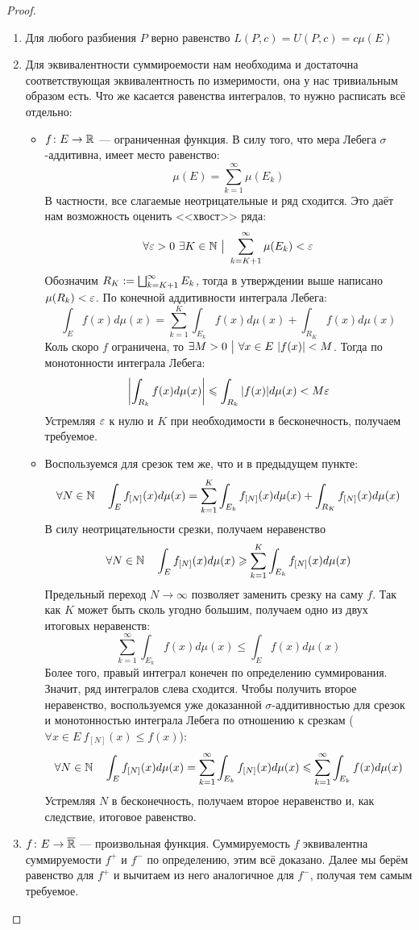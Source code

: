\begin{proof}~
	\begin{enumerate}
		\item Для любого разбиения $P$ верно равенство $L(P, c) = U(P, c) = c\mu(E)$
		
		\item Для эквивалентности суммироемости нам необходима и достаточна соответствующая эквивалентность по измеримости, она у нас тривиальным образом есть. Что же касается равенства интегралов, то нужно расписать всё отдельно:
		\begin{itemize}
			\item $f \colon E \to \mathbb{R}$ --- ограниченная функция. В силу того, что мера Лебега $\sigma$-аддитивна, имеет место равенство:
			\[
				\mu(E) = \sum_{k = 1}^\infty \mu(E_k)
			\]
			В частности, все слагаемые неотрицательные и ряд сходится. Это даёт нам возможность оценить <<хвост>> ряда:
			\[
				\forall \varepsilon > 0\ \exists K \in \mathbb{N} \ \big|\  \sum_{k = K + 1}^\infty \mu(E_k) < \varepsilon
			\]
			Обозначим $R_K := \bigsqcup_{k = K + 1}^\infty E_k$, тогда в утверждении выше написано $\mu(R_k) < \varepsilon$. По конечной аддитивности интеграла Лебега:
			\[
				\int_E f(x)d\mu(x) = \sum_{k = 1}^K \int_{E_k} f(x)d\mu(x) + \int_{R_K} f(x)d\mu(x)
			\]
			Коль скоро $f$ ограничена, то $\exists M > 0 \ \big|\   \forall x \in E\ |f(x)| < M$. Тогда по монотонности интеграла Лебега:
			\[
				\left|\int_{R_k} f(x)d\mu(x)\right| \leqslant \int_{R_k} |f(x)|d\mu(x) < M\varepsilon
			\]
			Устремляя $\varepsilon$ к нулю и $K$ при необходимости в бесконечность, получаем требуемое. 
			
			\item Воспользуемся для срезок тем же, что и в предыдущем пункте:
			\[
				\forall N \in \mathbb{N} \quad \int_E f_{[N]}(x)d\mu(x) = \sum_{k = 1}^K \int_{E_k} f_{[N]}(x)d\mu(x) + \int_{R_K} f_{[N]}(x)d\mu(x)
			\]
			В силу неотрицательности срезки, получаем неравенство
			\[
				\forall N \in \mathbb{N} \quad \int_E f_{[N]}(x)d\mu(x) \geqslant \sum_{k = 1}^K \int_{E_k} f_{[N]}(x)d\mu(x)
			\]
			Предельный переход $N \to \infty$ позволяет заменить срезку на саму $f$. Так как $K$ может быть сколь угодно большим, получаем одно из двух итоговых неравенств:
			\[
				\sum_{k = 1}^\infty \int_{E_k} f(x)d\mu(x) \le \int_E f(x)d\mu(x)
			\]
			Более того, правый интеграл конечен по определению суммирования. Значит, ряд интегралов слева сходится. Чтобы получить второе неравенство, воспользуемся уже доказанной $\sigma$-аддитивностью для срезок и монотонностью интеграла Лебега по отношению к срезкам ($\forall x \in E\ f_{[N]}(x) \le f(x)$):
			\[
				\forall N \in \mathbb{N} \quad \int_E f_{[N]}(x)d\mu(x) = \sum_{k = 1}^\infty \int_{E_k} f_{[N]}(x)d\mu(x) \leqslant \sum_{k = 1}^\infty \int_{E_k} f(x)d\mu(x)
			\]
			Устремляя $N$ в бесконечность, получаем второе неравенство и, как следствие, итоговое равенство.
		\end{itemize}
	
		\item $f \colon E \to \overline{\mathbb{R}}$ --- произвольная функция. Суммируемость $f$ эквивалентна суммируемости $f^+$ и $f^-$ по определению, этим всё доказано. Далее мы берём равенство для $f^+$ и вычитаем из него аналогичное для $f^-$, получая тем самым требуемое.
	\end{enumerate}
\end{proof}